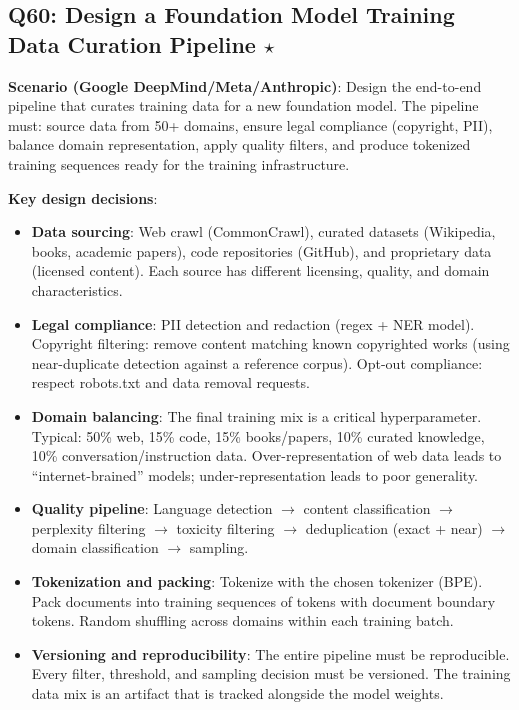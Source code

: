 \subsection{Q60: Design a Foundation Model Training Data Curation Pipeline $\star$}

\textbf{Scenario (Google DeepMind/Meta/Anthropic)}: Design the end-to-end pipeline that curates training data for a new foundation model. The pipeline must: source data from 50+ domains, ensure legal compliance (copyright, PII), balance domain representation, apply quality filters, and produce tokenized training sequences ready for the training infrastructure.

\textbf{Key design decisions}:
\begin{itemize}[leftmargin=*]
    \item \textbf{Data sourcing}: Web crawl (CommonCrawl), curated datasets (Wikipedia, books, academic papers), code repositories (GitHub), and proprietary data (licensed content). Each source has different licensing, quality, and domain characteristics.
    \item \textbf{Legal compliance}: PII detection and redaction (regex + NER model). Copyright filtering: remove content matching known copyrighted works (using near-duplicate detection against a reference corpus). Opt-out compliance: respect robots.txt and data removal requests.
    \item \textbf{Domain balancing}: The final training mix is a critical hyperparameter. Typical: 50\% web, 15\% code, 15\% books/papers, 10\% curated knowledge, 10\% conversation/instruction data. Over-representation of web data leads to ``internet-brained'' models; under-representation leads to poor generality.
    \item \textbf{Quality pipeline}: Language detection $\to$ content classification $\to$ perplexity filtering $\to$ toxicity filtering $\to$ deduplication (exact + near) $\to$ domain classification $\to$ sampling.
    \item \textbf{Tokenization and packing}: Tokenize with the chosen tokenizer (BPE). Pack documents into training sequences of  tokens with document boundary tokens. Random shuffling across domains within each training batch.
    \item \textbf{Versioning and reproducibility}: The entire pipeline must be reproducible. Every filter, threshold, and sampling decision must be versioned. The training data mix is an artifact that is tracked alongside the model weights.
\end{itemize}

